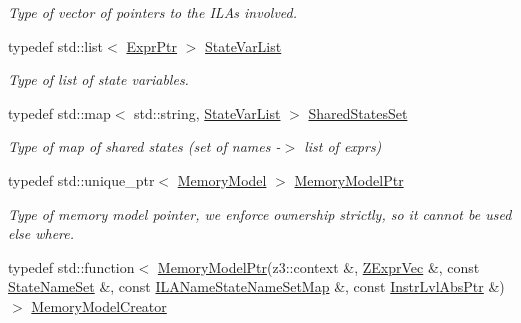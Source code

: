 \begin{DoxyCompactItemize}
\begin{DoxyCompactList}\small\item\em Type of vector of pointers to the I\+L\+As involved. \end{DoxyCompactList}\item 
\mbox{\label{classilang_1_1_inter_ila_unroller_adf26c108a1a2954c735c21e16373e81d}} 
typedef std\+::list$<$ \mbox{\hyperlink{namespaceilang_a7c4196c72e53ea4df4b7861af7bc3bce}{Expr\+Ptr}} $>$ \mbox{\hyperlink{classilang_1_1_inter_ila_unroller_adf26c108a1a2954c735c21e16373e81d}{State\+Var\+List}}
\begin{DoxyCompactList}\small\item\em Type of list of state variables. \end{DoxyCompactList}\item 
\mbox{\label{classilang_1_1_inter_ila_unroller_a86c14fdd9ecdb3c194c5620097aaf01e}} 
typedef std\+::map$<$ std\+::string, \mbox{\hyperlink{classilang_1_1_inter_ila_unroller_adf26c108a1a2954c735c21e16373e81d}{State\+Var\+List}} $>$ \mbox{\hyperlink{classilang_1_1_inter_ila_unroller_a86c14fdd9ecdb3c194c5620097aaf01e}{Shared\+States\+Set}}
\begin{DoxyCompactList}\small\item\em Type of map of shared states (set of names -\/$>$ list of exprs) \end{DoxyCompactList}\item 
\mbox{\label{classilang_1_1_inter_ila_unroller_aed4209693907f472d4bf20f4b1752232}} 
typedef std\+::unique\+\_\+ptr$<$ \mbox{\hyperlink{classilang_1_1_memory_model}{Memory\+Model}} $>$ \mbox{\hyperlink{classilang_1_1_inter_ila_unroller_aed4209693907f472d4bf20f4b1752232}{Memory\+Model\+Ptr}}
\begin{DoxyCompactList}\small\item\em Type of memory model pointer, we enforce ownership strictly, so it cannot be used else where. \end{DoxyCompactList}\item 
\mbox{\label{classilang_1_1_inter_ila_unroller_a3f06eb0ada6cdaee6ac0e1f7ad511b1c}} 
typedef std\+::function$<$ \mbox{\hyperlink{classilang_1_1_inter_ila_unroller_aed4209693907f472d4bf20f4b1752232}{Memory\+Model\+Ptr}}(z3\+::context \&, \mbox{\hyperlink{classilang_1_1_inter_ila_unroller_ae83ebf1fea382fb26be5c53052e86ae4}{Z\+Expr\+Vec}} \&, const \mbox{\hyperlink{classilang_1_1_inter_ila_unroller_a6be4afc388acb3f408871255fedb96cf}{State\+Name\+Set}} \&, const \mbox{\hyperlink{classilang_1_1_inter_ila_unroller_ab5d4e092989c943ae2978dd9e01e016a}{I\+L\+A\+Name\+State\+Name\+Set\+Map}} \&, const \mbox{\hyperlink{namespaceilang_ad1b30fdf347e493b3937143da05d1a72}{Instr\+Lvl\+Abs\+Ptr}} \&)$>$ \mbox{\hyperlink{classilang_1_1_inter_ila_unroller_a3f06eb0ada6cdaee6ac0e1f7ad511b1c}{Memory\+Model\+Creator}}

\end{DoxyCompactItemize}

